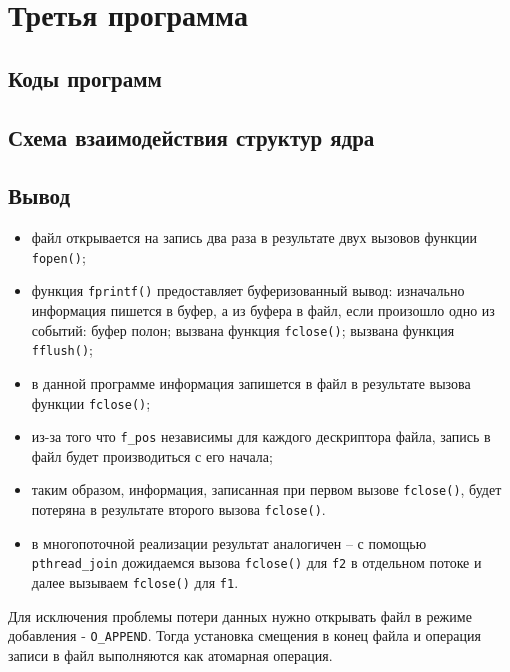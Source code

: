 \section{Третья программа}

\subsection{Коды программ}



\clearpage



\subsection{Схема взаимодействия структур ядра}


\subsection*{Вывод}

\begin{itemize}
	\item файл открывается на запись два раза в результате двух вызовов функции \texttt{fopen()};
	\item функция \texttt{fprintf()} предоставляет буферизованный вывод: изначально информация пишется в буфер, а из буфера в файл, если произошло одно из событий:
		\subitem буфер полон;
		\subitem вызвана функция \texttt{fclose()};
		\subitem вызвана функция \texttt{fflush()};
	\item в данной программе информация запишется в файл в результате вызова функции \texttt{fclose()};
	\item из-за того что \texttt{f\_pos} независимы для каждого дескриптора файла, запись в файл будет производиться с его начала;
	\item таким образом, информация, записанная при первом вызове \texttt{fclose()}, будет потеряна в результате второго вызова \texttt{fclose()}.
	\item в многопоточной реализации результат аналогичен -- с помощью \texttt{pthread\_join} дожидаемся вызова \texttt{fclose()} для \texttt{f2} в отдельном потоке и далее вызываем \texttt{fclose()} для \texttt{f1}.
\end{itemize}

Для исключения проблемы потери данных нужно открывать файл в режиме добавления - \texttt{O\_APPEND}. Тогда установка смещения в конец файла и операция записи в файл выполняются как атомарная операция.